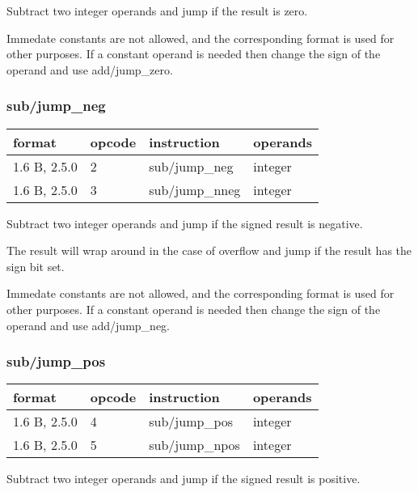 \documentclass[forwardcom.tex]{subfiles}
\begin{document}
Subtract two integer operands and jump if the result is zero.
\vspace{2mm}

Immedate constants are not allowed, and the corresponding format is used for other purposes.
If a constant operand is needed then change the sign of the operand and use add/jump\_zero. 

\subsubsection{sub/jump\_neg}
\label{table:subJumpNegInstruction}
\begin{tabular}{|p{20mm}|p{12mm}|p{56mm}|p{50mm}|}
\hline
\bfseries format & \bfseries opcode & \bfseries instruction & \bfseries operands \\ \hline
1.6 B, 2.5.0 &  2 & sub/jump\_neg & integer \\ \hline
1.6 B, 2.5.0 &  3 & sub/jump\_nneg & integer\\ \hline
\end{tabular}
\vspace{2mm}

Subtract two integer operands and jump if the signed result is negative.

The result will wrap around in the case of overflow and jump if the result has the sign bit set.
\vspace{2mm}

Immedate constants are not allowed, and the corresponding format is used for other purposes.
If a constant operand is needed then change the sign of the operand and use add/jump\_neg. 

\subsubsection{sub/jump\_pos}
\label{table:subJumpPosInstruction}
\begin{tabular}{|p{20mm}|p{12mm}|p{56mm}|p{50mm}|}
\hline
\bfseries format & \bfseries opcode & \bfseries instruction & \bfseries operands \\ \hline
1.6 B, 2.5.0 &  4 & sub/jump\_pos & integer \\ \hline
1.6 B, 2.5.0 &  5 & sub/jump\_npos & integer\\ \hline
\end{tabular}
\vspace{2mm}

Subtract two integer operands and jump if the signed result is positive.
\end{document}
